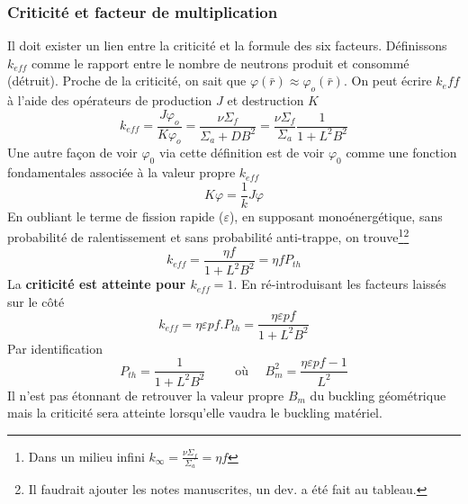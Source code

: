 \subsubsection{Criticité et facteur de multiplication}
Il doit exister un lien entre la criticité et la formule des six facteurs. Définissons $k_{eff}$ 
comme le rapport entre le nombre de neutrons produit et consommé (détruit). Proche de la criticité, 
on sait que $\varphi (\bar r) \approx {\varphi _o}(\bar r)$. On peut écrire $k_eff$ à l'aide des 
opérateurs de production $J$ et destruction $K$
\begin{equation}
{k_{eff}} = \frac{{J{\varphi _o}}}{{K{\varphi _o}}} = \frac{{\nu {\Sigma _f}}}{{{\Sigma _a} + D{B^2}}}
 = \frac{{\nu {\Sigma _f}}}{{{\Sigma _a}}}\frac{1}{{1 + {L^2}{B^2}}}
\end{equation}
Une autre façon de voir $\varphi_0$ via cette définition est de voir $\varphi_0$ comme une 
fonction fondamentales associée à la valeur propre $k_{eff}$
\begin{equation}
K\varphi  = \frac{1}{k}J\varphi 
\end{equation}
En oubliant le terme de fission rapide ($\varepsilon$), en supposant monoénergétique, sans 
probabilité de ralentissement et sans probabilité anti-trappe, on trouve\footnote{Dans un 
milieu infini ${k_\infty } = \frac{{\nu {\Sigma _f}}}{{{\Sigma _a}}} = \eta f$}\footnote{Il faudrait
ajouter les notes manuscrites, un dev. a été fait au tableau.}
\begin{equation}
{k_{eff}} = \frac{{\eta f}}{{1 + {L^2}{B^2}}} = \eta f{P_{th}}
\end{equation}
La \textbf{criticité est atteinte pour $k_{eff}=1$}. En ré-introduisant les facteurs laissés sur le
côté
\begin{equation}
{k_{eff}} = \eta \varepsilon pf.{P_{th}} = \frac{{\eta \varepsilon pf}}{{1 + {L^2}{B^2}}}
\end{equation}
Par identification
\begin{equation}
P_{th} = \dfrac{1}{1+L^2B^2}\qquad\text{ où }\quad B_m^2 = \frac{{\eta \varepsilon pf - 1}}{{{L^2}}}
\end{equation}
Il n'est pas étonnant de retrouver la valeur propre $B_m$ du buckling géométrique mais la criticité 
sera atteinte lorsqu'elle vaudra le buckling matériel.\\

